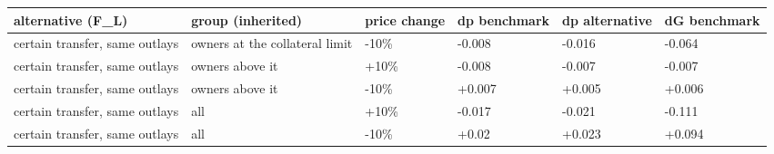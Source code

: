 \begingroup\small
\setlength{\tabcolsep}{3pt}
\renewcommand{\arraystretch}{1.04}
\begin{tabularx}{\linewidth}{XXXXXX}
\toprule
alternative (F\_L) & group (inherited) & price change & dp benchmark & dp alternative & dG benchmark \\
\midrule
certain transfer, same outlays & owners at the collateral limit & -10\% & -0.008 & -0.016 & -0.064 \\
certain transfer, same outlays & owners above it & +10\% & -0.008 & -0.007 & -0.007 \\
certain transfer, same outlays & owners above it & -10\% & +0.007 & +0.005 & +0.006 \\
certain transfer, same outlays & all & +10\% & -0.017 & -0.021 & -0.111 \\
certain transfer, same outlays & all & -10\% & +0.02 & +0.023 & +0.094 \\
\bottomrule
\end{tabularx}
\endgroup
